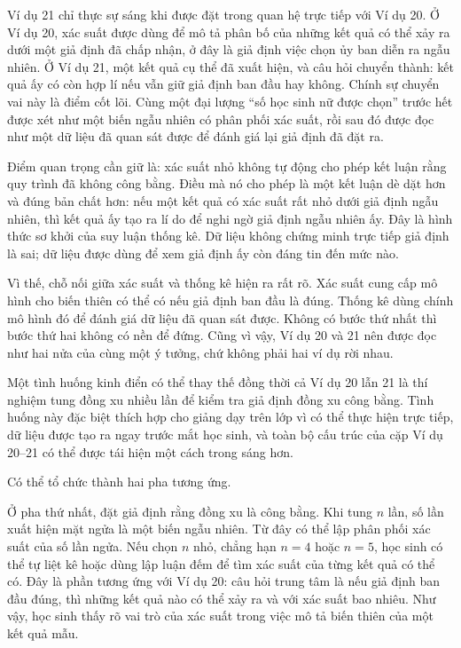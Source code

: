\documentclass[
  10pt,
  a4paper,
  landscape,
  twoside,
  openany
]{scrbook}
\begin{document}
{
Ví dụ 21 chỉ thực sự sáng khi được đặt trong quan hệ trực tiếp với Ví dụ 20. Ở Ví dụ 20, xác suất được dùng để mô tả phân bố của những kết quả có thể xảy ra dưới một giả định đã chấp nhận, ở đây là giả định việc chọn ủy ban diễn ra ngẫu nhiên. Ở Ví dụ 21, một kết quả cụ thể đã xuất hiện, và câu hỏi chuyển thành: kết quả ấy có còn hợp lí nếu vẫn giữ giả định ban đầu hay không. Chính sự chuyển vai này là điểm cốt lõi. Cùng một đại lượng “số học sinh nữ được chọn” trước hết được xét như một biến ngẫu nhiên có phân phối xác suất, rồi sau đó được đọc như một dữ liệu đã quan sát được để đánh giá lại giả định đã đặt ra.

Điểm quan trọng cần giữ là: xác suất nhỏ không tự động cho phép kết luận rằng quy trình đã không công bằng. Điều mà nó cho phép là một kết luận dè dặt hơn và đúng bản chất hơn: nếu một kết quả có xác suất rất nhỏ dưới giả định ngẫu nhiên, thì kết quả ấy tạo ra lí do để nghi ngờ giả định ngẫu nhiên ấy. Đây là hình thức sơ khởi của suy luận thống kê. Dữ liệu không chứng minh trực tiếp giả định là sai; dữ liệu được dùng để xem giả định ấy còn đáng tin đến mức nào.

Vì thế, chỗ nối giữa xác suất và thống kê hiện ra rất rõ. Xác suất cung cấp mô hình cho biến thiên có thể có nếu giả định ban đầu là đúng. Thống kê dùng chính mô hình đó để đánh giá dữ liệu đã quan sát được. Không có bước thứ nhất thì bước thứ hai không có nền để đứng. Cũng vì vậy, Ví dụ 20 và 21 nên được đọc như hai nửa của cùng một ý tưởng, chứ không phải hai ví dụ rời nhau.

Một tình huống kinh điển có thể thay thế đồng thời cả Ví dụ 20 lẫn 21 là thí nghiệm tung đồng xu nhiều lần để kiểm tra giả định đồng xu công bằng. Tình huống này đặc biệt thích hợp cho giảng dạy trên lớp vì có thể thực hiện trực tiếp, dữ liệu được tạo ra ngay trước mắt học sinh, và toàn bộ cấu trúc của cặp Ví dụ 20--21 có thể được tái hiện một cách trong sáng hơn.

Có thể tổ chức thành hai pha tương ứng.

Ở pha thứ nhất, đặt giả định rằng đồng xu là công bằng. Khi tung $n$ lần, số lần xuất hiện mặt ngửa là một biến ngẫu nhiên. Từ đây có thể lập phân phối xác suất của số lần ngửa. Nếu chọn $n$ nhỏ, chẳng hạn $n=4$ hoặc $n=5$, học sinh có thể tự liệt kê hoặc dùng lập luận đếm để tìm xác suất của từng kết quả có thể có. Đây là phần tương ứng với Ví dụ 20: câu hỏi trung tâm là nếu giả định ban đầu đúng, thì những kết quả nào có thể xảy ra và với xác suất bao nhiêu. Như vậy, học sinh thấy rõ vai trò của xác suất trong việc mô tả biến thiên của một kết quả mẫu.

}
\end{document}
